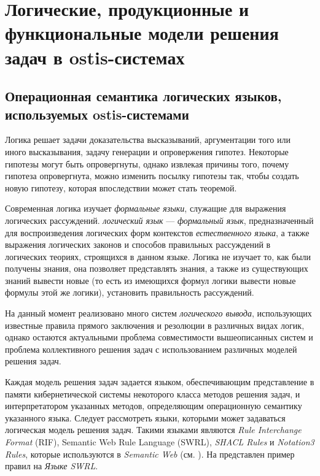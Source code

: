 \chapter{Логические, продукционные и функциональные модели решения задач в ostis-системах}
\label{chapter_logic_productions}

\vspace{-7\baselineskip}

\section{Операционная семантика логических языков, используемых ostis-системами}
\label{logic_lang_os}


Логика решает задачи доказательства высказываний, аргументации того или иного высказывания, задачу генерации и опровержения гипотез. Некоторые гипотезы могут быть опровергнуты, однако извлекая причины того, почему гипотеза опровергнута, можно изменить посылку гипотезы так, чтобы создать новую гипотезу, которая впоследствии может стать теоремой.

Современная логика изучает \textit{формальные языки}, служащие для выражения логических рассуждений. \textit{логический язык} — \textit{формальный язык}, предназначенный для воспроизведения логических форм контекстов \textit{естественного языка}, а также выражения логических законов и способов правильных рассуждений в логических теориях, строящихся в данном языке. Логика не изучает то, как были получены знания, она позволяет представлять знания, а также из существующих знаний вывести новые (то есть из имеющихся формул логики вывести новые формулы этой же логики), установить правильность рассуждений.

На данный момент реализовано много систем \textit{логического вывода}, использующих известные правила прямого заключения и резолюции в различных видах логик, однако остаются актуальными проблема совместимости вышеописанных систем и проблема коллективного решения задач с использованием различных моделей решения задач.

Каждая модель решения задач задается языком, обеспечивающим представление в памяти кибернетической системы некоторого класса методов решения задач, и интерпретатором указанных методов, определяющим операционную семантику указанного языка. Следует рассмотреть языки, которыми может задаваться логическая модель решения задач. Такими языками являются \textit{Rule Interchange Format} (RIF), Semantic Web Rule Language (SWRL), \textit{SHACL Rules} и \textit{Notation3 Rules}, которые используются в \textit{Semantic Web} (см. ). На \textit{} представлен пример правил на \textit{Языке SWRL}.

